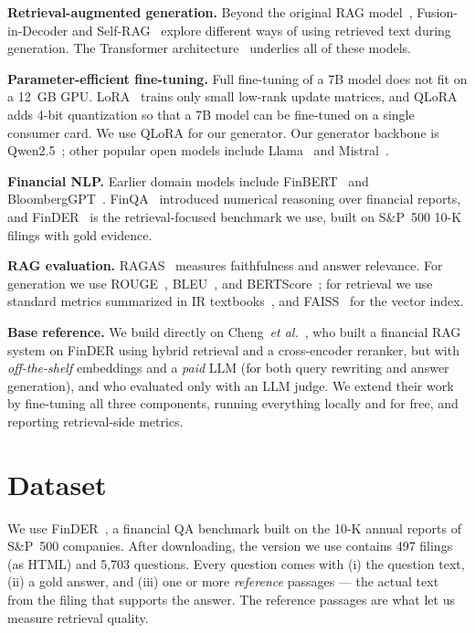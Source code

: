 \documentclass[conference]{IEEEtran}
\begin{document}
\textbf{Retrieval-augmented generation.} Beyond the original RAG model~\cite{lewis2020rag}, Fusion-in-Decoder
\cite{izacard2021fid} and Self-RAG~\cite{asai2023selfrag} explore different ways of using retrieved text
during generation. The Transformer architecture~\cite{vaswani2017attention} underlies all of these models.

\textbf{Parameter-efficient fine-tuning.} Full fine-tuning of a 7B model does not fit on a 12~GB GPU.
LoRA~\cite{hu2021lora} trains only small low-rank update matrices, and QLoRA~\cite{dettmers2023qlora}
adds 4-bit quantization so that a 7B model can be fine-tuned on a single consumer card. We use QLoRA for
our generator. Our generator backbone is Qwen2.5~\cite{qwen2024}; other popular open models include
Llama~\cite{touvron2023llama} and Mistral~\cite{jiang2023mistral}.

\textbf{Financial NLP.} Earlier domain models include FinBERT~\cite{araci2019finbert} and
BloombergGPT~\cite{wu2023bloomberggpt}. FinQA~\cite{chen2021finqa} introduced numerical reasoning over
financial reports, and FinDER~\cite{finder2025} is the retrieval-focused benchmark we use, built on
S\&P~500 10-K filings with gold evidence.

\textbf{RAG evaluation.} RAGAS~\cite{es2023ragas} measures faithfulness and answer relevance. For
generation we use ROUGE~\cite{lin2004rouge}, BLEU~\cite{papineni2002bleu}, and
BERTScore~\cite{zhang2020bertscore}; for retrieval we use standard metrics summarized in IR
textbooks~\cite{manning2008ir}, and FAISS~\cite{johnson2019faiss} for the vector index.

\textbf{Base reference.} We build directly on Cheng~\textit{et al.}~\cite{basepaper2026}, who built a
financial RAG system on FinDER using hybrid retrieval and a cross-encoder reranker, but with
\emph{off-the-shelf} embeddings and a \emph{paid} LLM (for both query rewriting and answer generation),
and who evaluated only with an LLM judge. We extend their work by fine-tuning all three components,
running everything locally and for free, and reporting retrieval-side metrics.

\section{Dataset}
We use FinDER~\cite{finder2025}, a financial QA benchmark built on the 10-K annual reports of S\&P~500
companies. After downloading, the version we use contains 497 filings (as HTML) and 5{,}703 questions.
Every question comes with (i) the question text, (ii) a gold answer, and (iii) one or more
\emph{reference} passages --- the actual text from the filing that supports the answer. The reference
passages are what let us measure retrieval quality.
\end{document}
